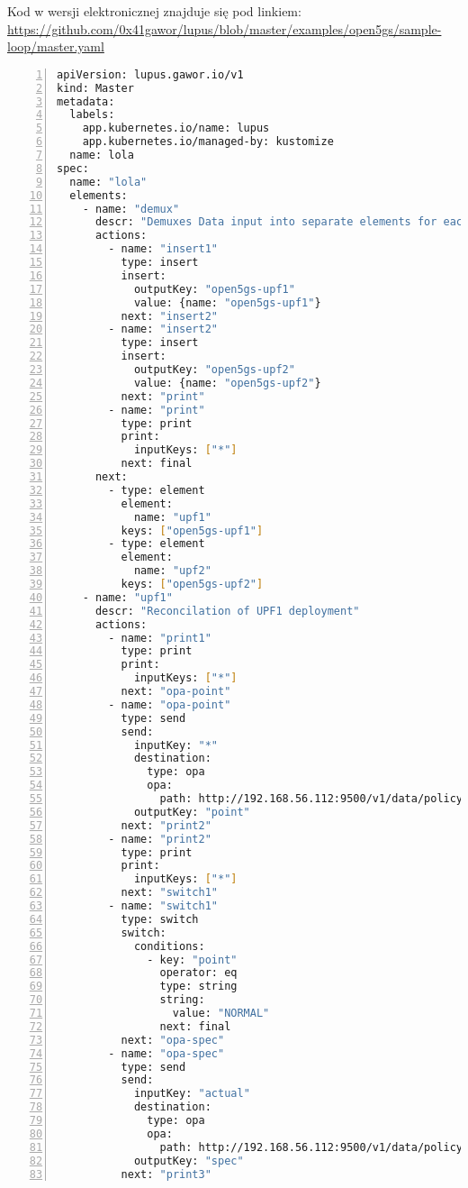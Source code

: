 \hypertarget{appendix:10}{}

Kod w wersji elektronicznej znajduje się pod linkiem: \url{https://github.com/0x41gawor/lupus/blob/master/examples/open5gs/sample-loop/master.yaml}

\begin{lstlisting}[language=sh, caption={\emph{Kod LupN}}, label={lst:a101}, numbers=left, stepnumber=1]
apiVersion: lupus.gawor.io/v1
kind: Master
metadata:
  labels:
    app.kubernetes.io/name: lupus
    app.kubernetes.io/managed-by: kustomize
  name: lola
spec:
  name: "lola"
  elements:
    - name: "demux"
      descr: "Demuxes Data input into separate elements for each UPF"
      actions: 
        - name: "insert1"
          type: insert
          insert:
            outputKey: "open5gs-upf1"
            value: {name: "open5gs-upf1"}
          next: "insert2"
        - name: "insert2"
          type: insert
          insert:
            outputKey: "open5gs-upf2"
            value: {name: "open5gs-upf2"}
          next: "print"
        - name: "print"
          type: print
          print:
            inputKeys: ["*"]
          next: final
      next:
        - type: element
          element:
            name: "upf1"
          keys: ["open5gs-upf1"]
        - type: element
          element:
            name: "upf2"
          keys: ["open5gs-upf2"]
    - name: "upf1"
      descr: "Reconcilation of UPF1 deployment"
      actions:
        - name: "print1"
          type: print
          print:
            inputKeys: ["*"]
          next: "opa-point"
        - name: "opa-point"
          type: send
          send: 
            inputKey: "*"
            destination: 
              type: opa
              opa: 
                path: http://192.168.56.112:9500/v1/data/policy/point
            outputKey: "point"
          next: "print2"
        - name: "print2"
          type: print
          print:
            inputKeys: ["*"]
          next: "switch1"
        - name: "switch1"
          type: switch
          switch:
            conditions:
              - key: "point"
                operator: eq
                type: string
                string: 
                  value: "NORMAL"
                next: final
          next: "opa-spec"
        - name: "opa-spec"
          type: send
          send: 
            inputKey: "actual"
            destination: 
              type: opa
              opa: 
                path: http://192.168.56.112:9500/v1/data/policy/spec
            outputKey: "spec"
          next: "print3"

\end{lstlisting}
